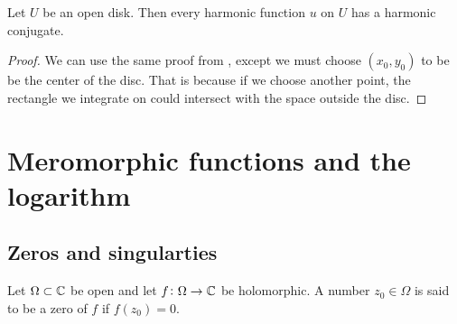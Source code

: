 \documentclass[11pt,a4paper]{article}
\begin{document}
\begin{proposition}
  Let $U$ be an open disk.
  Then every harmonic function $u$ on $U$ has a harmonic conjugate.
\end{proposition}
\begin{proof}
  We can use the same proof from ,
  except we must choose $(x_0,y_0)$ to be be the center of the disc.
  That is because if we choose another point, the rectangle
  we integrate on could intersect with the space outside the disc.
\end{proof}


\newpage

\section{Meromorphic functions and the logarithm}

\subsection{Zeros and singularties}
\begin{definition}[Zero]
  Let $\Omega \subset \mathbb{C}$ be open and let $f \colon \Omega \to \mathbb{C}$ be
  holomorphic.
  A number $z_0 \in \Omega$ is said to be a zero of $f$ if $f(z_0) = 0$.
\end{definition}
\end{document}
